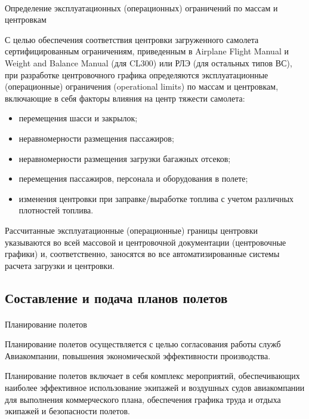 \paragraph{} Определение эксплуатационных (операционных) ограничений по массам и центровкам 

С целью обеспечения соответствия центровки загруженного самолета сертифицированным ограничениям, приведенным в Airplane Flight Manual и Weight and Balance Manual (для CL300) или РЛЭ (для остальных типов ВС), при разработке центровочного графика определяются эксплуатационные (операционные) ограничения (operational limits) по массам и центровкам, включающие в себя факторы влияния на центр тяжести самолета: 

\begin{itemize}
    \item перемещения шасси и закрылок; 
    \item неравномерности размещения пассажиров;
    \item неравномерности размещения загрузки багажных отсеков;
    \item перемещения пассажиров, персонала и оборудования в полете;
    \item изменения центровки при заправке/выработке топлива с учетом различных плотностей топлива.     
\end{itemize}
	
Рассчитанные эксплуатационные (операционные) границы центровки указываются во всей массовой и центровочной документации (центровочные графики) и, соответственно, заносятся во все автоматизированные системы расчета загрузки и центровки.


\subsection{Составление и подача планов полетов}

\paragraph{} Планирование полетов

Планирование полетов осуществляется с целью согласования работы служб Авиакомпании, повышения экономической эффективности производства.

Планирование полетов включает в себя комплекс мероприятий, обеспечивающих наиболее эффективное использование экипажей и воздушных судов авиакомпании для выполнения коммерческого плана, обеспечения графика труда и отдыха экипажей и безопасности полетов.

